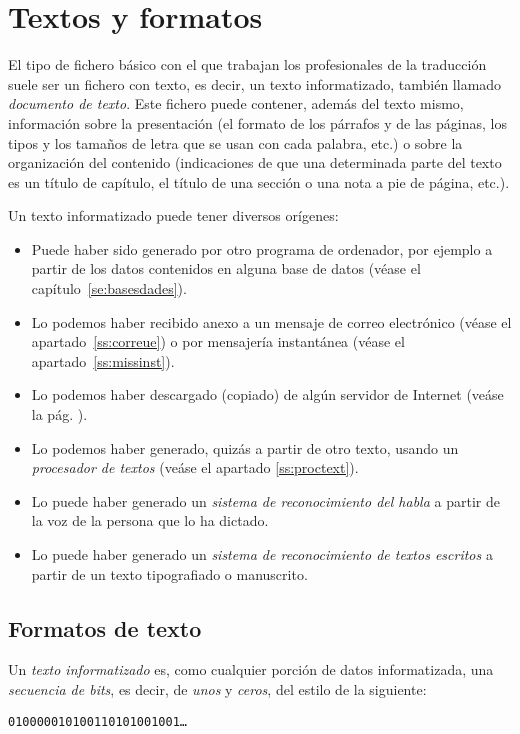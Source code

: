 \chapter{Textos y formatos} \label{se:EPT} 

El tipo de fichero básico con el que trabajan los profesionales de la traducción suele ser un fichero con texto, es decir, un texto informatizado, también llamado \emph{documento de texto}. Este fichero puede contener, además del texto mismo, información sobre la presentación (el formato de los párrafos y de las páginas, los tipos y los tamaños de letra que se usan con cada palabra, etc.) o sobre la organización del contenido (indicaciones de que una determinada parte del texto es un título de capítulo, el título de una sección o una nota a pie de página, etc.). 

Un texto informatizado puede tener diversos orígenes: \begin{itemize} \item Puede haber sido generado por otro programa de ordenador, por ejemplo a partir de los datos contenidos en alguna base de datos (véase el capítulo~\ref{se:basesdades}). \item Lo podemos haber recibido anexo a un mensaje de correo electrónico (véase el apartado~\ref{ss:correue}) o por mensajería instantánea (véase el apartado~\ref{ss:missinst}). \item Lo podemos haber descargado (copiado) de algún servidor de Internet (veáse la pág. \pageref{pg:ftp}). \item Lo podemos haber generado, quizás a partir de otro texto, usando un \emph{procesador de textos} (veáse el apartado \ref{ss:proctext}). \item Lo puede haber generado un \emph{sistema de reconocimiento del habla} a partir de la voz de la persona que lo ha dictado. \item Lo puede haber generado un \emph{sistema de reconocimiento de textos escritos} a partir de un texto tipografiado o manuscrito. \end{itemize} 

\section{Formatos de texto} \label{ss:formats} Un \emph{texto informatizado} es, como cualquier porción de datos informatizada, una \emph{secuencia de bits}, es decir, de \emph{unos} y \emph{ceros}, del estilo de la siguiente:  \begin{center} \texttt{010000010100110101001001\ldots} \end{center} 

